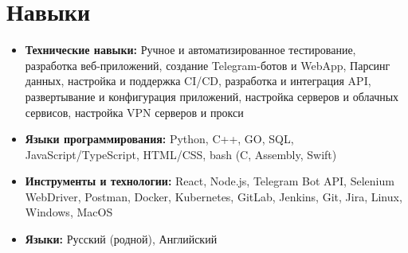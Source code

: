 \documentclass[a4paper,11pt]{article}
\begin{document}
\section{Навыки}
\begin{itemize}[leftmargin=*]
  \item \textbf{Технические навыки:} Ручное и автоматизированное тестирование,
   разработка веб-приложений, создание Telegram-ботов и WebApp,
   Парсинг данных,
   настройка и поддержка CI/CD, разработка и интеграция API,
   развертывание и конфигурация приложений,
   настройка серверов и облачных сервисов,
   настройка VPN серверов и прокси

  \item \textbf{Языки программирования:} Python, C++, GO, SQL, JavaScript/TypeScript, HTML/CSS, bash (C, Assembly, Swift)

  \item \textbf{Инструменты и технологии:} React, Node.js, Telegram Bot API, Selenium WebDriver, Postman, Docker, Kubernetes, GitLab, Jenkins, Git, Jira, Linux, Windows, MacOS

  \item \textbf{Языки:} Русский (родной), Английский
\end{itemize}




\end{document}
